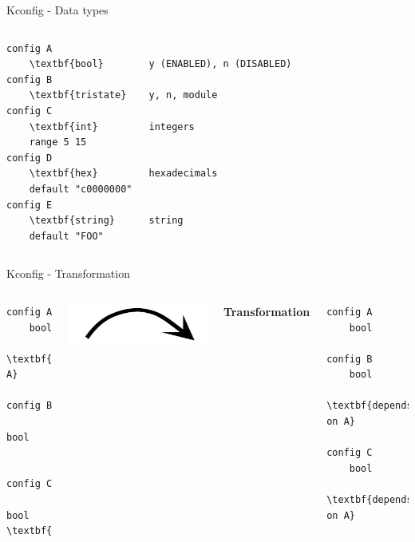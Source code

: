 \documentclass[mathserif,serif]{beamer}
\begin{document}
\begin{frame}[t,fragile]{Kconfig - Data types}
    \begin{columns}[T]
    \begin{Verbatim}
config A
    \textbf{bool}
config B
    \textbf{tristate}
config C
    \textbf{int}
    range 5 15
config D
    \textbf{hex}
    default "c0000000"
config E
    \textbf{string}
    default "FOO"
    \end{Verbatim}
    \begin{Verbatim}

y (ENABLED), n (DISABLED)

y, n, module

integers 


hexadecimals 


string
    \end{Verbatim}
    \end{columns}
\end{frame}

\begin{frame}[t,fragile]{Kconfig - Transformation}
    \begin{columns}[c]
    \begin{Verbatim}
config A
    bool

\textbf{if A}
    config B
        bool
    
    config C
        bool
\textbf{endif}
    \end{Verbatim}

    \includegraphics[scale=.3]{arrowright.png}

    \textbf{Transformation}
    

    \begin{Verbatim}
config A
    bool

config B
    bool
    \textbf{depends on A}

config C
    bool
    \textbf{depends on A}
    \end{Verbatim}
    \end{columns}
\end{frame}
\end{document}
